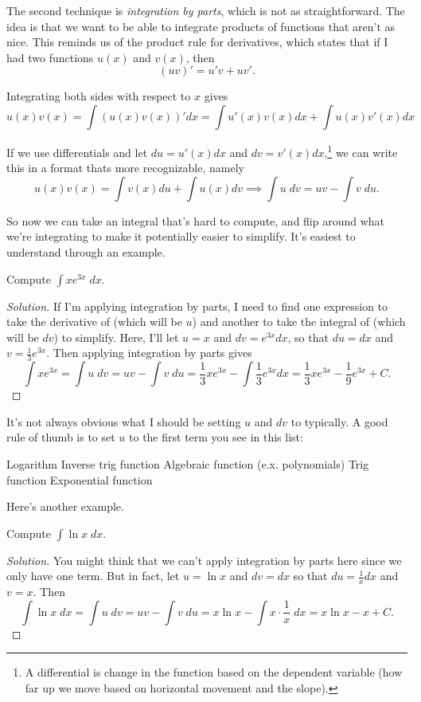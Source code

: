 \documentclass[11 pt]{scrartcl}
\begin{document}
The second technique is \emph{integration by parts}, which is not as straightforward. The idea is that we want to be able to integrate products of functions that aren't as nice. This reminds us of the product rule for derivatives, which states that if I had two functions $u(x)$ and $v(x)$, then 
\[ (uv)' = u'v + uv'.\] 

Integrating both sides with respect to $x$ gives 
\[ u(x) v(x) = \int (u(x) v(x))' dx  = \int u'(x) v(x) dx + \int u(x) v'(x) dx \]

If we use differentials and let $du = u'(x) dx$ and $dv = v'(x) dx$,\footnote{A differential is change in the function based on the dependent variable (how far up we move based on horizontal movement and the slope).} we can write this in a format thats more recognizable, namely 
\[ u(x) v(x) = \int v(x) du + \int u(x) dv \implies \boxed{\int u\; dv = uv - \int v\; du}.\] 

So now we can take an integral that's hard to compute, and flip around what we're integrating to make it potentially easier to simplify. It's easiest to understand through an example. 

\begin{example}
    Compute $\int xe^{3x}\; dx$. 
\end{example}
\begin{proof}[Solution]
    If I'm applying integration by parts, I need to find one expression to take the derivative of (which will be $u$) and another to take the integral of (which will be $dv$) to simplify. Here, I'll let $u = x$ and $dv = e^{3x} dx$, so that $du = dx$ and $v = \frac 13 e^{3x}$. Then applying integration by parts gives 
    \[ \int xe^{3x} = \int u\; dv = uv - \int v\; du = \frac 13 xe^{3x} - \int \frac 13 e^{3x} dx = \frac 13 xe^{3x} - \frac 19 e^{3x} + C.\] 
\end{proof}

It's not always obvious what I should be setting $u$ and $dv$ to typically. A good rule of thumb is to set $u$ to the first term you see in this list: 
\begin{itemize}
    \ii Logarithm 
    \ii Inverse trig function 
    \ii Algebraic function (e.x. polynomials)
    \ii Trig function 
    \ii Exponential function
\end{itemize}

Here's another example. 
\begin{example}
    Compute $\int \ln x \; dx$.  
\end{example}
\begin{proof}[Solution]
    You might think that we can't apply integration by parts here since we only have one term. But in fact, let $u = \ln x$ and $dv = dx$ so that $du = \frac{1}{x} dx$ and $v = x$. Then 
    \[ \int \ln x\; dx = \int u \; dv = uv - \int v\; du = x\ln x - \int x\cdot \frac{1}{x} \; dx = x\ln x - x + C.\] 
\end{proof}
\end{document}

